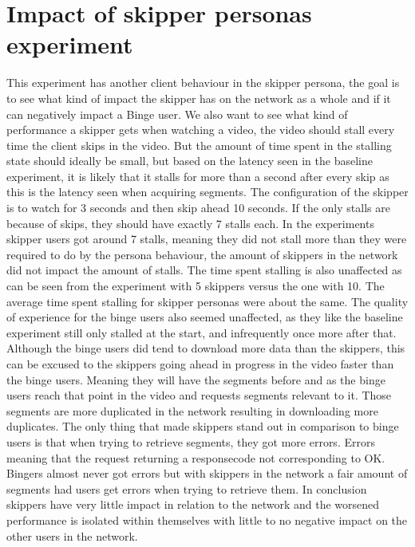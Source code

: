 \section{Impact of skipper personas experiment}
This experiment has another client behaviour in the skipper persona, the goal is to see what kind of impact the skipper has on the network as a whole and if it can negatively impact a Binge user. We also want to see what kind of performance a skipper gets when watching a video, the video should stall every time the client skips in the video. But the amount of time spent in the stalling state should ideally be small, but based on the latency seen in the baseline experiment, it is likely that it stalls for more than a second after every skip as this is the latency seen when acquiring segments. The configuration of the skipper is to watch for 3 seconds and then skip ahead 10 seconds. If the only stalls are because of skips, they should have exactly 7 stalls each.
In the experiments skipper users got around 7 stalls, meaning they did not stall more than they were required to do by the persona behaviour, the amount of skippers in the network did not impact the amount of stalls. The time spent stalling is also unaffected as can be seen from the experiment with 5 skippers versus the one with 10. The average time spent stalling for skipper personas were about the same. %
The quality of experience for the binge users also seemed unaffected, as they like the baseline experiment still only stalled at the start, and infrequently once more after that. %
Although the binge users did tend to download more data than the skippers, this can be excused to the skippers going ahead in progress in the video faster than the binge users. Meaning they will have the segments before and as the binge users reach that point in the video and requests segments relevant to it. Those segments are more duplicated in the network resulting in downloading more duplicates. %
The only thing that made skippers stand out in comparison to binge users is that when trying to retrieve segments, they got more errors. Errors meaning that the request returning a responsecode not corresponding to OK. Bingers almost never got errors but with skippers in the network a fair amount of segments had users get errors when trying to retrieve them. %
In conclusion skippers have very little impact in relation to the network and the worsened performance is isolated within themselves with little to no negative impact on the other users in the network.

